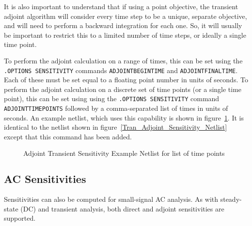 It is also important to understand that if using a point objective, the 
transient adjoint algorithm will consider every time step to be a unique, 
separate objective, and will need to perform a backward integration for each one.  
So, it will usually be important to restrict this to a limited number of time 
steps, or ideally a single time point.

To perform the adjoint calculation on a range of times, this can be set using 
the \texttt{.OPTIONS SENSITIVITY} commands \texttt{ADJOINTBEGINTIME} and 
\texttt{ADJOINTFINALTIME}.  Each of these must be set equal to a floating point
number in units of seconds.  To perform the adjoint calculation on a discrete 
set of time points (or a single time point), this can be set using using the 
\texttt{.OPTIONS SENSITIVITY} command \texttt{ADJOINTTIMEPOINTS} followed by a 
comma-separated list of times in units of seconds.  An example netlist, which 
uses this capability is shown in figure~\ref{Tran_Adjoint_Sensitivity_Netlist2}.  
It is identical to the netlist shown in figure~\ref{Tran_Adjoint_Sensitivity_Netlist} 
except that this command has been added.
\begin{figure}[htbp]
  \begin{centering}
\caption[Adjoint Transient Sensitivity Example Netlist for list of time points]
{Adjoint Transient Sensitivity Example Netlist for list of time points\label{Tran_Adjoint_Sensitivity_Netlist2} }
\end{centering}
\end{figure}

\clearpage
\subsection{AC Sensitivities}
Sensitivities can also be computed for small-signal AC analysis.  As
with steady-state (DC) and transient analysis, both direct and adjoint
sensitivities are supported.  

